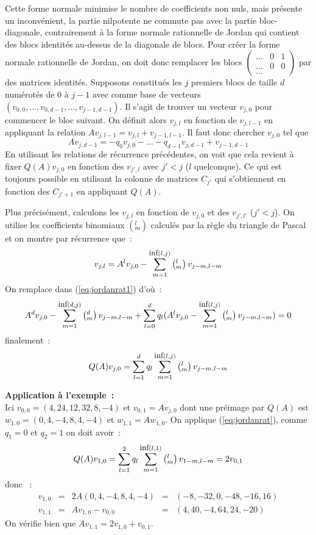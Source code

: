 \documentclass[a4paper,11pt]{article}
\begin{document}
\begin{giacjshere}
Cette forme normale minimise le nombre de coefficients non nuls,
mais présente un inconvénient, la partie nilpotente ne commute pas
avec la partie bloc-diagonale, contrairement à la forme normale
rationnelle de Jordan qui contient des blocs identités au-dessus
de la diagonale de blocs.
Pour créer la forme normale rationnelle de Jordan, on doit donc remplacer
les blocs $\left( \begin{array}{ccc} ... & 0 & 1 \\ ... & 0 & 0 
\\ ... \end{array} \right)$
par des matrices identit\'es. Supposons constitués les $j$ premiers blocs de
taille $d$ numérotés de 0 à $j-1$ avec comme base de vecteurs
$(v_{0,0},...,v_{0,d-1},...,v_{j-1,d-1})$. 
Il s'agit de trouver un vecteur $v_{j,0}$ pour commencer le bloc
suivant. On définit alors $v_{j,l}$ en fonction de $v_{j,l-1}$
en appliquant la relation $Av_{j,l-1}=v_{j,l}+v_{j-1,l-1}$.
Il faut donc chercher $v_{j,0}$ tel que 
\begin{equation} \label{eq:jordanrat1}
 Av_{j,d-1}=-q_0 v_{j,0}-...-q_{d-1} v_{j,d-1}+v_{j-1,d-1} 
\end{equation}
En utilisant les relations de récurrence précédentes, on voit que
cela revient à fixer $Q(A)v_{j,0}$ en fonction des $v_{j',l}$ avec
$j'<j$ ($l$ quelconque). Ce qui est toujours possible en utilisant
la colonne de matrices $C_{j'}$ qui s'obtiennent en
fonction des $C_{j'+1}$ en appliquant $Q(A)$.

Plus pr\'ecis\'ement, calculons les $v_{j,l}$ en fonction de $v_{j,0}$
et des $v_{j',l'}$ ($j'<j$). On utilise les coefficients binomiaux 
$\left( ^l_m\right)$ calcul\'es par la r\`egle du triangle de Pascal et
on montre par r\'ecurrence que~:
\begin{equation} \label{eq:jordanrat3}
v_{j,l} = A^l v_{j,0} - \sum_{m=1}^{\mbox{\small inf}(l,j)} 
\left( ^l _m\right) v_{j-m,l-m}
\end{equation}
On remplace dans (\ref{eq:jordanrat1}) d'o\`u~:
\[ A^d v_{j,0} - \sum_{m=1}^{\mbox{\small inf}(d,j)} 
\left( ^d _m\right)v_{j-m,l-m}
+ \sum_{l=0}^d 
q_l (A^l v_{j,0} - \sum_{m=1}^{\mbox{\small inf}(l,j)} \left( ^l _m\right) 
v_{j-m,l-m} )=0
\]
finalement~:
\begin{equation} \label{eq:jordanrat}
 Q(A) v_{j,0}= \sum_{l=1}^d 
q_l \sum_{m=1}^{\mbox{\small inf}(l,j)} \left( ^l _m\right) v_{j-m,l-m} 
\end{equation}

{\bf Application \`a l'exemple~:}\\
Ici $v_{0,0}=(4,24,12,32,8,-4)$ et $v_{0,1}=Av_{j,0}$ dont une pr\'eimage
par $Q(A)$ est $w_{1,0}=(0,4,-4,8,4,-4)$ et $w_{1,1}=Aw_{1,0}$.
On applique (\ref{eq:jordanrat}), comme $q_1=0$ et $q_2=1$
on doit avoir~:
\[ Q(A) v_{1,0} = \sum_{l=1}^2
q_l \sum_{m=1}^{\mbox{\small inf}(l,1)} \left( ^l _m\right) v_{1-m,l-m} 
 =2v_{0,1} \]
donc ~:
\[\begin{array}{ccccc}
 v_{1,0}&=&2A(0,4,-4,8,4,-4)&=&(-8,-32,0,-48,-16,16) \\
 v_{1,1}&=&Av_{1,0}-v_{0,0}&=&(4,40,-4,64,24,-20) 
\end{array}
\]
On v\'erifie bien que $Av_{1,1}=2v_{1,0}+v_{0,1}$.


\end{giacjshere}
\end{document}
